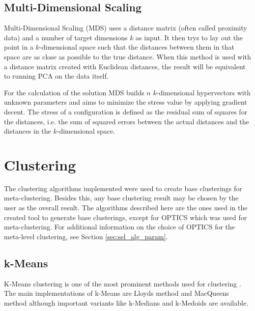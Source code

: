 \documentclass[
	a4paper,
	english,
	twoside,
	openright,               
	11pt                            
	]{report}
\begin{document}







\subsection{Multi-Dimensional Scaling}
Multi-Dimensional Scaling (MDS) \cite{mds} uses a distance matrix (often called proximity data) and a number of target dimensions $k$ as input. It then trys to lay out the point in a $k$-dimensional space such that the distances between them in that space are as close as possible to the true distance. When this method is used with a distance matrix created with Euclidean distances, the result will be equivalent to running PCA on the data itself. 

For the calculation of the solution MDS builds $n$ $k$-dimensional hypervectors with unknown parameters and aims to minimize the stress value by applying gradient decent. The stress of a configuration is defined as the residual sum of squares for the distances, i.e. the sum of squared errors between the actual distances and the distances in the $k$-dimensional space.

\section{Clustering}
The clustering algorithms implemented were used to create base clusterings for meta-clustering. Besides this, any base clustering result may be chosen by the user as the overall result. The algorithms described here are the ones used in the created tool to generate base clusterings, except for OPTICS which was used for meta-clustering. For additional information on the choice of OPTICS for the meta-level clustering, see Section \ref{sec:sel_alg_param}.

\subsection{k-Means}
K-Means clustering is one of the most prominent methods used for clustering \cite{Jin2010}. The main implementations of k-Means are Lloyds method \cite{4031353} and MacQueens method \cite{macqueen1967} although important variants like k-Medians \cite{Dohan2015KmedianAT} and k-Medoids \cite{kmedoids}  are available.
\end{document}
